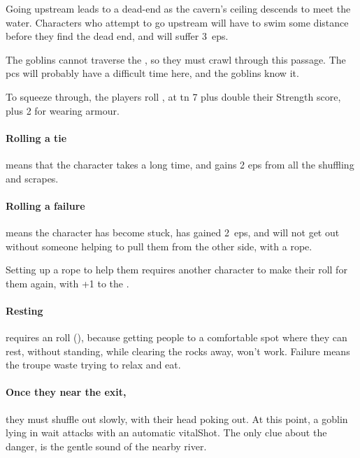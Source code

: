 \begin{multicols}{2}
Going upstream leads to a dead-end as the cavern's ceiling descends to meet the water.
Characters who attempt to go upstream will have to swim some distance before they find the dead end, and will suffer 3~\glspl{ep}.



The goblins cannot traverse the , so they must crawl through this passage.
The \glspl{pc} will probably have a difficult time here, and the goblins know it.

To squeeze through, the players roll , at \gls{tn} 7 plus double their Strength score, plus 2 for wearing armour.

\paragraph{Rolling a tie}
means that the character takes a long time, and gains 2 \glspl{ep} from all the shuffling and scrapes.

\paragraph{Rolling a failure}
means the character has become stuck, has gained 2~\glspl{ep}, and will not get out without someone helping to pull them from the other side, with a rope.

Setting up a rope to help them requires another character to make their roll for them again, with +1 to the .

\paragraph{Resting}
requires an  roll (\tn[10]), because getting people to a comfortable spot where they can rest, without standing, while clearing the rocks away, won't work.
Failure means the troupe waste  trying to relax and eat.

\paragraph{Once they near the exit,}
they must shuffle out slowly, with their head poking out.
At this point, a goblin lying in wait attacks with an automatic \gls{vitalShot}.
The only clue about the danger, is the gentle sound of the nearby river.


\end{multicols}
